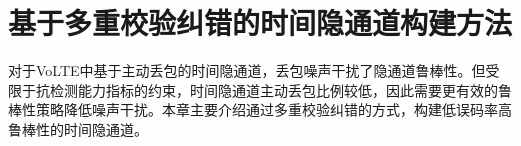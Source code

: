 \chapter{基于多重校验纠错的时间隐通道构建方法}
\label{chap:hash}

对于VoLTE中基于主动丢包的时间隐通道，丢包噪声干扰了隐通道鲁棒性。但受限于抗检测能力指标的约束，时间隐通道主动丢包比例较低，因此需要更有效的鲁棒性策略降低噪声干扰。本章主要介绍通过多重校验纠错的方式，构建低误码率高鲁棒性的时间隐通道。






